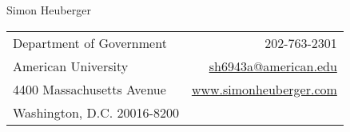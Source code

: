 \documentclass[10pt]{article}
\begin{document}
\thispagestyle{empty}
\begin{center}
\huge
Simon Heuberger \\
\end{center}

\begin{center}
 \begin{tabular*}{1\textwidth}{@{\extracolsep{\fill}}lr}
Department of Government & 202-763-2301 \\  
American University  & \href{mailto:sh6943a@american.edu}{sh6943a@american.edu}\\
4400 Massachusetts Avenue & \href{www.simonheuberger.com}{www.simonheuberger.com}\\
Washington, D.C. 20016-8200 & 
  
\end{tabular*}
\end{center}
\end{document}
